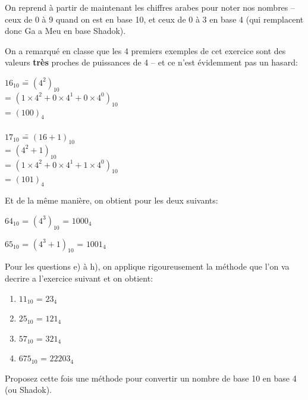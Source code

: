\documentclass[12pt]{article}
\begin{document}
	\begin{MaReponse}
		On reprend à partir de maintenant les chiffres arabes pour noter nos nombres -- ceux de 0 à 9 quand on est en base 10, et ceux de 0 à 3 en base 4 (qui remplacent donc Ga a Meu en base Shadok).
		
		On a remarqué en classe que les 4 premiers exemples de cet exercice sont des valeurs \textbf{très} proches de puissances de 4 -- et ce n'est évidemment pas un hasard:
		\begin{tabbing}
			$16_{10}$ \==  $(4^{2})_{10}$ \\
			\>= $(1 \times 4^{2} + 0 \times 4^{1} + 0 \times 4^{0})_{10}$ \\
			\>= $(100)_{4}$
			\\ \\
			$17_{10}$ \==  $(16 + 1)_{10}$ \\
			\>=  $(4^{2} + 1)_{10}$ \\
			\>= $(1 \times 4^{2} + 0 \times 4^{1} + 1 \times 4^{0})_{10}$ \\
			\>= $(101)_{4}$
		\end{tabbing}
		Et de la même manière, on obtient pour les deux suivants:
		
		$64_{10}$ =  $(4^{3})_{10}$ =  $1000_{4}$
		
		$65_{10}$ =  $(4^{3} + 1)_{10}$ =  $1001_{4}$

		Pour les questions e) à h), on applique rigoureusement la méthode que l'on va decrire a l'exercice suivant et on obtient:
		\begin{enumerate}[label=\alph*.,start=5]
			\item $11_{10}$ = $23_4$
			\item $25_{10}$ = $121_4$
			\item $57_{10}$ = $321_4$
			\item $675_{10}$ = $22203_4$
		\end{enumerate}
	\end{MaReponse}
	
	\begin{MonExo}
		Proposez cette fois une méthode pour convertir un nombre de base 10 en base 4 (ou Shadok).
	\end{MonExo}
	
\end{document}
